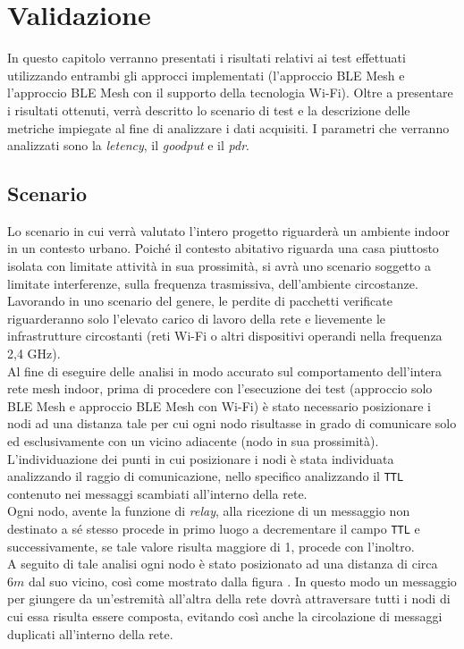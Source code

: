 \chapter{Validazione}
\label{ch:validazione}

In questo capitolo verranno presentati i risultati relativi ai test effettuati utilizzando entrambi gli approcci implementati (l'approccio BLE Mesh e l'approccio BLE Mesh con il supporto della tecnologia Wi-Fi). Oltre a presentare i risultati ottenuti, verrà descritto lo scenario di test e la descrizione delle metriche impiegate al fine di analizzare i dati acquisiti. I parametri che verranno analizzati sono la \textit{letency}, il \textit{goodput} e il \textit{pdr}.

\section{Scenario}
Lo scenario in cui verrà valutato l'intero progetto riguarderà un ambiente indoor in un contesto urbano. Poiché il contesto abitativo riguarda una casa piuttosto isolata con limitate attività in sua prossimità, si avrà uno scenario soggetto a limitate interferenze, sulla frequenza trasmissiva, dell'ambiente circostanze. Lavorando in uno scenario del genere, le perdite di pacchetti verificate riguarderanno solo l'elevato carico di lavoro della rete e lievemente le infrastrutture circostanti (reti Wi-Fi o altri dispositivi operandi nella frequenza 2,4 GHz).\\

\noindent Al fine di eseguire delle analisi in modo accurato sul comportamento dell'intera rete mesh indoor, prima di procedere con l'esecuzione dei test (approccio solo BLE Mesh e approccio BLE Mesh con Wi-Fi) è stato necessario posizionare i nodi ad una distanza tale per cui ogni nodo risultasse in grado di comunicare solo ed esclusivamente con un vicino adiacente (nodo in sua prossimità). L'individuazione dei punti in cui posizionare i nodi è stata individuata analizzando il raggio di comunicazione, nello specifico analizzando il \texttt{TTL} contenuto nei messaggi scambiati all'interno della rete.\\ 
Ogni nodo, avente la funzione di \textit{relay}, alla ricezione di un messaggio non destinato a sé stesso procede in primo luogo a decrementare il campo \texttt{TTL} e successivamente, se tale valore risulta maggiore di 1, procede con l'inoltro.\\
A seguito di tale analisi ogni nodo è stato posizionato ad una distanza di circa $6m$ dal suo vicino, così come mostrato dalla figura . In questo modo un messaggio per giungere da un'estremità all'altra della rete dovrà attraversare tutti i nodi di cui essa risulta essere composta, evitando così anche la circolazione di messaggi duplicati all'interno della rete.

